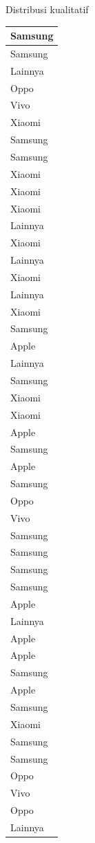 \documentclass[
  ignorenonframetext,
]{beamer}
\begin{document}
\begin{frame}[s]{Distribusi kualitatif}
\begin{table}
\begin{tabular}[t]{l}
\hline
Samsung\\
\hline
Samsung\\
\hline
Lainnya\\
\hline
Oppo\\
\hline
Vivo\\
\hline
Xiaomi\\
\hline
Samsung\\
\hline
Samsung\\
\hline
Xiaomi\\
\hline
Xiaomi\\
\hline
Xiaomi\\
\hline
Lainnya\\
\hline
Xiaomi\\
\hline
Lainnya\\
\hline
Xiaomi\\
\hline
Lainnya\\
\hline
Xiaomi\\
\hline
Samsung\\
\hline
Apple\\
\hline
Lainnya\\
\hline
Samsung\\
\hline
Xiaomi\\
\hline
Xiaomi\\
\hline
Apple\\
\hline
Samsung\\
\hline
Apple\\
\hline
Samsung\\
\hline
Oppo\\
\hline
Vivo\\
\hline
Samsung\\
\hline
Samsung\\
\hline
Samsung\\
\hline
Samsung\\
\hline
Apple\\
\hline
Lainnya\\
\hline
Apple\\
\hline
Apple\\
\hline
Samsung\\
\hline
Apple\\
\hline
Samsung\\
\hline
Xiaomi\\
\hline
Samsung\\
\hline
Samsung\\
\hline
Oppo\\
\hline
Vivo\\
\hline
Oppo\\
\hline
Lainnya\\

\end{tabular}
\end{table}
\end{frame}
\end{document}
